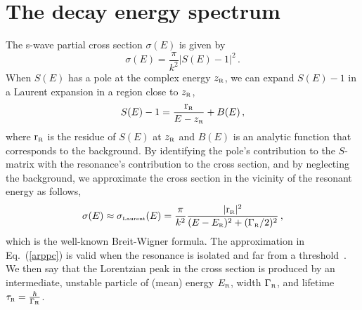 \documentclass[12pt]{article}
\newcommand{\zr}{z_{\text{\tiny R}}}
\newcommand{\gr}{\Gamma _{\text{\tiny R}}}
\newcommand{\er}{E_{\text{\tiny R}}}
\begin{document}
         


           










\section{The decay energy spectrum}
\setcounter{equation}{0}
\label{sec:spectrum}

The s-wave partial cross section $\sigma (E)$ is given by~\cite{TAYLOR}
\begin{equation}
      \sigma (E)= \frac{\pi}{k^2} |S(E)-1|^2 \, .
       \label{crossec}
\end{equation}
When $S(E)$ has a pole at the complex energy $\zr$, we can expand $S(E)-1$ in
a Laurent expansion in a region close to $\zr$,
\begin{equation}
       S(E)-1= \frac{{\rm r}_{\text{\tiny R}}}{E-\zr} +B(E) \, ,
       \label{laurent}
\end{equation}
where ${\rm r}_{\text{\tiny R}}$ is the residue of $S(E)$ at $\zr$ and $B(E)$
is an analytic function that corresponds to the background. By identifying
the pole's contribution to the $S$-matrix with the resonance's contribution
to the cross section, and by neglecting the background, we approximate the
cross section in the vicinity of the resonant energy as follows,
\begin{equation}
      \sigma (E)\approx \sigma_{\text{\tiny Laurent}}(E) =\frac{\pi}{k^2} 
\frac{|{\rm r}_{\text{\tiny R}}|^2}{(E-\er)^2+(\gr/2)^2} \, ,
        \label{arppc}
\end{equation}
which is the well-known Breit-Wigner formula. The approximation in
Eq.~(\ref{arppc}) is valid when the resonance is isolated and far from 
a threshold~\cite{NOTE2}. We then say that the Lorentzian
peak in the cross section is produced by an intermediate, unstable particle
of (mean) energy $\er$, width $\gr$, and lifetime 
$\tau _{\text{\tiny R}} =\frac{\hbar}{\gr}$.
\end{document}
